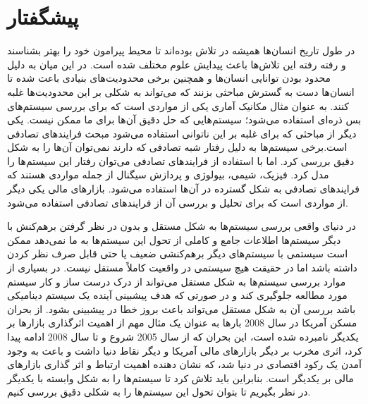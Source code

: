 \chapter*{پیشگفتار}
\label{intro} 
در طول تاریخ انسان‌ها همیشه در تلاش بوده‌اند تا محیط پیرامون خود را بهتر بشناسند و 
رفته رفته این تلاش‌ها باعث پیدایش علوم مختلف شده است. در این میان به دلیل محدود بودن توانایی انسان‌ها و همچنین برخی 
محدودیت‌های بنیادی باعث شده تا انسان‌ها دست به گسترش مباحثی بزنند که می‌تواند به شکلی بر این محدودیت‌ها غلبه کنند. 
به عنوان مثال مکانیک آماری یکی از مواردی است که برای بررسی سیستم‌های بس ذره‌ای استفاده می‌شود؛ سیستم‌هایی که 
حل دقیق آن‌ها برای ما ممکن نیست. یکی دیگر از مباحثی که برای غلبه بر این ناتوانی استفاده می‌شود مبحث 
فرایندهای تصادفی است.برخی سیستم‌ها به دلیل رفتار شبه تصادفی که دارند نمی‌توان آن‌ها را به شکل دقیق بررسی کرد. 
اما با استفاده از فرایندهای تصادفی می‌توان رفتار این سیستم‌ها را مدل کرد.
فیزیک\cite{paul_stochastic_2013}، شیمی\cite{kampen_stochastic_2007}، بیولوژی\cite{bressloff_stochastic_2014} و پردازش سیگنال\cite{dougherty_random_1999} 
 از جمله مواردی هستند که فرایندهای تصادفی به شکل گسترده در آن‌ها استفاده می‌شود.
بازارهای مالی یکی دیگر از مواردی است که برای تحلیل و بررسی آن از فرایندهای تصادفی استفاده می‌شود. \cite{steele_stochastic_2001,shreve_continuous-time_2008}

در دنیای واقعی بررسی سیستم‌ها به شکل مستقل و بدون در نظر گرفتن 
برهم‌کنش با دیگر سیستم‌ها اطلاعات جامع و کاملی از تحول این سیستم‌ها 
به ما نمی‌دهد ممکن است سیستمی با سیستم‌های دیگر برهم‌کنشی 
ضعیف یا حتی قابل صرف نظر کردن داشته باشد اما 
در حقیقت هیچ سیستمی در واقعیت کاملاً مستقل نیست. 
در بسیاری از موارد بررسی سیستم‌ها به شکل مستقل 
می‌تواند از درک درست ساز و کار سیستم مورد مطالعه جلوگیری کند و 
در صورتی که هدف پیشبینی آینده یک سیستم دینامیکی باشد بررسی آن به شکل 
مستقل می‌تواند باعث بروز خطا در پیشبینی بشود.
از بحران مسکن آمریکا در سال 2008 بارها به 
عنوان یک مثال مهم از اهمیت اثرگذاری بازارها بر یکدیگر نامبرده شده است، این بحران که از 
سال 2005 شروع و تا سال 2008 ادامه پیدا کرد، اثری مخرب بر دیگر بازارهای مالی آمریکا 
و دیگر نقاط دنیا داشت و باعث به وجود آمدن 
یک رکود اقتصادی در دنیا شد، که نشان دهنده 
اهمیت ارتباط و اثر گذاری بازارهای مالی بر یکدیگر است.\cite{islam_great_2011, 7344854}
بنابراین باید تلاش کرد تا سیستم‌ها را به شکل وابسته با 
یکدیگر در نظر بگیریم تا بتوان تحول این سیستم‌ها را به شکلی دقیق بررسی کنیم.


